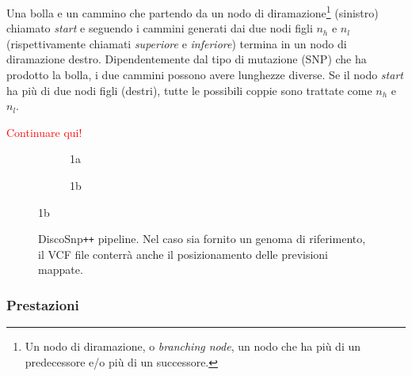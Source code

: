 \documentclass[../main.tex]{subfiles}
\begin{document}
\begin{definition}
Una bolla e un cammino che partendo da un nodo di diramazione\footnote{Un nodo di diramazione, o \textit{branching node}, un nodo che ha più di un predecessore e/o più di un successore.} (sinistro) chiamato \textit{start} e seguendo i cammini generati dai due nodi figli $n_h$ e $n_l$ (rispettivamente chiamati \textit{superiore} e \textit{inferiore}) termina in un nodo di diramazione destro. Dipendentemente dal tipo di mutazione (SNP) che ha prodotto la bolla, i due cammini possono avere lunghezze diverse. Se il nodo \textit{start} ha più di due nodi figli (destri), tutte le possibili coppie sono trattate come $n_h$ e $n_l$.
\end{definition}

\textcolor{red}{Continuare qui!}

\begin{figure}[ht]
\begin{subfigure}{.5\textwidth}
  \centering
  \caption{1a}
  \label{fig:sfig1}
\end{subfigure}
\begin{subfigure}{.5\textwidth}
  \centering
  \caption{1b}
  \label{fig:sfig2}
\end{subfigure}
\end{figure}

\begin{figure}[h]
	\centering
  	\captionsetup{justification=centering}
  	\caption{DiscoSnp\texttt{++} pipeline. Nel caso sia fornito un genoma di riferimento, il VCF file conterrà anche il posizionamento delle previsioni mappate.}
  	\label{fig:pipe1}
\end{figure}

\subsubsection{Prestazioni}
\end{document}
